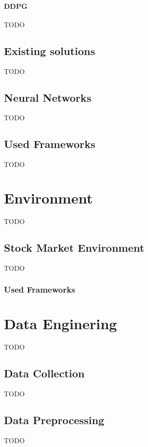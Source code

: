 \subsubsection{DDPG}
TODO


\section{Existing solutions}
TODO


\section{Neural Networks}
TODO


\section{Used Frameworks}
TODO



\chapter{Environment}
TODO


\section{Stock Market Environment}
TODO

\subsection{Used Frameworks}




\chapter{Data Enginering}
TODO


\section{Data Collection}
TODO


\section{Data Preprocessing}
TODO

